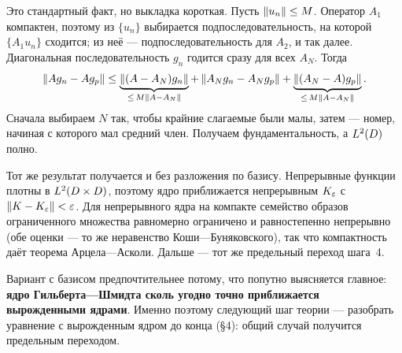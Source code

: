\begin{idea}[title={Почему предел компактных операторов компактен}]
Это стандартный факт, но выкладка короткая. Пусть $\left\lVert u_n \right\rVert \le M$. Оператор
$A_1$ компактен, поэтому из $\{u_n\}$ выбирается подпоследовательность, на
которой $\{A_1 u_n\}$ сходится; из неё — подпоследовательность для $A_2$, и так
далее. Диагональная последовательность $g_n$ годится сразу для всех $A_N$.
Тогда
\[
  \left\lVert A g_n - A g_p \right\rVert
  \le \underbrace{\left\lVert (A - A_N) g_n \right\rVert}_{\le\, M\left\lVert A-A_N \right\rVert}
    + \left\lVert A_N g_n - A_N g_p \right\rVert
    + \underbrace{\left\lVert (A_N - A) g_p \right\rVert}_{\le\, M\left\lVert A-A_N \right\rVert} .
\]
Сначала выбираем $N$ так, чтобы крайние слагаемые были малы, затем — номер,
начиная с которого мал средний член. Получаем фундаментальность, а $L^{2}(D)$
полно.
\end{idea}

\begin{idea}[title={Второй способ: приближение непрерывным ядром}]
Тот же результат получается и без разложения по базису. Непрерывные функции
плотны в $L^{2}(D\times D)$, поэтому ядро приближается непрерывным $K_\varepsilon$ с
$\left\lVert K - K_\varepsilon \right\rVert < \varepsilon$. Для непрерывного ядра на компакте семейство
образов ограниченного множества равномерно ограничено и равностепенно
непрерывно (обе оценки — то же неравенство Коши—Буняковского), так что
компактность даёт теорема Арцела—Асколи. Дальше — тот же предельный переход
шага~4.

\medskip
Вариант с базисом предпочтительнее потому, что попутно выясняется главное:
\textbf{ядро Гильберта—Шмидта сколь угодно точно приближается вырожденными
ядрами}. Именно поэтому следующий шаг теории — разобрать уравнение с
вырожденным ядром до конца (\S4): общий случай получится предельным
переходом.
\end{idea}
